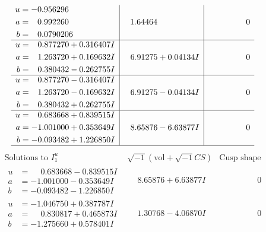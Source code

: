 \documentclass[1p]{elsarticle_modified}
\theoremstyle{definition}
\newcommand{\I}{\sqrt{-1}}
\begin{document}
$$\begin{array}{c|c|c}
\begin{aligned}
u &= -0.956296\phantom{ +0.000000I} \\
a &= \phantom{-}0.992260\phantom{ +0.000000I} \\
b &= \phantom{-}0.0790206\phantom{ +0.000000I}\end{aligned}
 & \phantom{-}1.64464\phantom{ +0.000000I} & \phantom{-0.000000 } 0 \\ \hline\begin{aligned}
u &= \phantom{-}0.877270 + 0.316407 I \\
a &= \phantom{-}1.263720 + 0.169632 I \\
b &= \phantom{-}0.380432 - 0.262755 I\end{aligned}
 & \phantom{-}6.91275 + 0.04134 I & \phantom{-0.000000 } 0 \\ \hline\begin{aligned}
u &= \phantom{-}0.877270 - 0.316407 I \\
a &= \phantom{-}1.263720 - 0.169632 I \\
b &= \phantom{-}0.380432 + 0.262755 I\end{aligned}
 & \phantom{-}6.91275 - 0.04134 I & \phantom{-0.000000 } 0 \\ \hline\begin{aligned}
u &= \phantom{-}0.683668 + 0.839515 I \\
a &= -1.001000 + 0.353649 I \\
b &= -0.093482 + 1.226850 I\end{aligned}
 & \phantom{-}8.65876 - 6.63877 I & \phantom{-0.000000 } 0\\
 \hline 
 \end{array}$$\newpage$$\begin{array}{c|c|c}  
\text{Solutions to }I^u_{1}& \I (\text{vol} + \sqrt{-1}CS) & \text{Cusp shape}\\
 \hline 
\begin{aligned}
u &= \phantom{-}0.683668 - 0.839515 I \\
a &= -1.001000 - 0.353649 I \\
b &= -0.093482 - 1.226850 I\end{aligned}
 & \phantom{-}8.65876 + 6.63877 I & \phantom{-0.000000 } 0 \\ \hline\begin{aligned}
u &= -1.046750 + 0.387787 I \\
a &= \phantom{-}0.830817 + 0.465873 I \\
b &= -1.275660 + 0.578401 I\end{aligned}
 & \phantom{-}1.30768 - 4.06870 I & \phantom{-0.000000 } 0 \\ \hline\begin{aligned}

\end{aligned}
\end{array}$$
\end{document}
